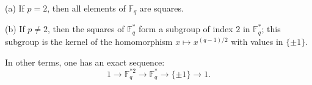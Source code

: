 (a) If $p = 2$, then all elements of $\mathbb{F}_q$ are squares.

(b) If $p \neq 2$, then the squares of $\mathbb{F}_q^*$ form a subgroup of index $2$ in $\mathbb{F}_q^*$; this subgroup is the kernel of the homomorphism $x \mapsto x^{(q-1)/2}$ with values in $\{\pm 1\}$.

In other terms, one has an exact sequence:
$$1 \rightarrow \mathbb{F}_q^{*2} \rightarrow \mathbb{F}_q^* \rightarrow \{\pm 1\} \rightarrow 1.$$
